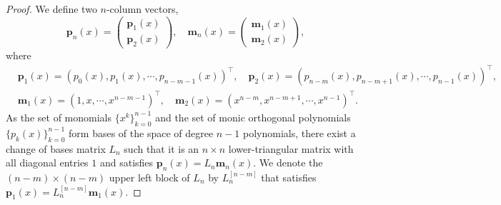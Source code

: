 \documentclass[10pt,a4paper]{amsart}
\begin{document}
\begin{proof}
We define two $n$-column vectors,
\[
\bm p_{n}(x) = \begin{pmatrix}
    \bm p_{1}(x)\\
    \bm p_{2}(x)
\end{pmatrix}, \quad \bm m_{n}(x) = \begin{pmatrix}
    \bm m_{1}(x)\\
    \bm m_{2}(x)
\end{pmatrix},
\]
where
\begin{align}
&\bm p_{1}(x) = \left(p_0(x), p_1(x), \cdots,p_{n-m-1}(x) \right)^\top, \quad \bm p_{2}(x) = \left( p_{n-m}(x), p_{n-m+1}(x), \cdots, p_{n-1}(x) \right)^\top,\\
&\bm m_{1}(x) = \left( 1,x,\cdots,x^{n-m-1} \right)^\top, \quad \bm m_{2}(x) = \left( x^{n-m}, x^{n-m+1}, \cdots, x^{n-1} \right)^\top.
\end{align}
As the set of monomials $\{x^k\}_{k=0}^{n-1}$ and the set of monic orthogonal polynomials $\{ p_k(x)\}_{k=0}^{n-1}$ form bases of the space of degree $n-1$ polynomials, there exist a change of bases matrix $L_{n}$ such that it is an $n \times n$ lower-triangular matrix with all diagonal entries $1$ and satisfies \( \bm{p}_n(x) = L_n \bm m_n(x) \).
We denote the $(n-m) \times (n-m)$ upper left block of $L_{n}$ by $L_{n}^{[n-m]}$ that satisfies \( \bm{p}_{1}(x) = L_n^{[n-m]} \bm m_{1}(x) \).


\end{proof}
\end{document}
